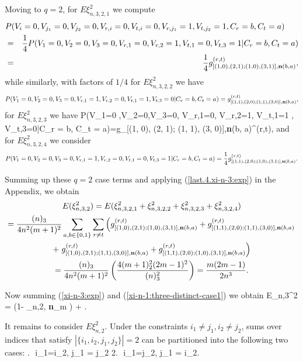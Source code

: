 \documentclass[10pt, amstex]{article}
\begin{document}
Moving to $q=2$, for $E\xi_{n,3,2,1}^2$ we compute
\begin{eqnarray*}
\lefteqn{P(V_i=0 ,V_{j_1}=0,V_{j_2}=0,V_{r,i}=0, V_{t, i} = 0, V_{r,j_1}=1, V_{t,j_2}=1, C_r = b, C_{t} = a)}\\
&=& \frac{1}{4}P(V_1=0 ,V_2=0,V_3=0,V_{r,1}=0, V_{r,2}=1, V_{t,1} = 0, V_{t,3}=1|C_r = b, C_t = a) \\
&=& \frac{1}{4} g_{[(1, 0), (2, 1); (1, 0), (3, 1)], {\bf
n}(b, a)}^{(r,t)},
\end{eqnarray*}
while similarly, with factors of $1/4$ for $E\xi_{n,3,2,2}^2$ we have
\begin{eqnarray*}
P(V_1=0 ,V_2=0,V_3=0,V_{r,1}=1,V_{r,2}=0, V_{t,1}=1, V_{t,3}=0 |C_r = b, C_t = a)
=g_{[(1, 1), (2, 0); (1, 1), (3, 0)],{\bf n}(b, a)}^{(r,t)},
\end{eqnarray*}
for $E\xi_{n,3,2,3}^2$ we have
\beas
P(V_1=0 ,V_2=0,V_3=0, V_{r,1}=0, V_{r,2}=1, V_{t,1}=1 , V_{t,3}=0|C_r = b, C_t = a)=g_{[(1, 0), (2, 1); (1, 1), (3, 0)],{\bf n}(b, a)}^{(r,t)},
\enas
and for $E\xi_{n,3,2,4}^2$ we consider
\begin{eqnarray*}
P(V_1=0 ,V_2=0, V_3=0, V_{r,1}=1, V_{r,2}=0, V_{t,1}=0, V_{t,3}=1|C_r = b, C_t = a)= \frac{1}{4}g_{[(1, 1), (2, 0); (1, 0), (3, 1)], {\bf n}(b, a)}^{(r,t)}.
\end{eqnarray*}


Summing up these $q=2$ case terms and applying (\ref{last.4.xi-n-3:exp}) in the Appendix, we obtain
\begin{multline} \label{xi-n-3:exp}
E(\xi_{n,3,2}^2)=E(\xi_{n,3,2,1}^2+\xi_{n,3,2,2}^2+\xi_{n,3,2,3}^2+\xi_{n,3,2,4}^2) \\
= \frac{(n)_3}{4n^2(m+1)^2}\sum_{a, b \in \{0, 1\}} \sum_{r \ne t} \left(
g_{[(1, 0), (2, 1); (1, 0), (3, 1)], {\bf
n}(b, a)}^{(r,t)} +g_{[(1, 1), (2, 0); (1, 1), (3, 0)], {\bf n}(b, a)}^{(r,t)} \right.  \\
 + \left.  g_{[(1, 0), (2, 1); (1, 1), (3, 0)],{\bf n}(b, a)}^{(r,t)} + g_{[(1, 1), (2, 0); (1, 0), (3, 1)], {\bf n}(b, a)}^{(r,t)} \right)\\
 =\frac{(n)_3}{4n^2(m+1)^2} \left( \frac{4(m+1)_2^2(2m-1)^2}{(n)_3^2} \right) = \frac{m(2m-1)}{2n^3}.
\end{multline}

Now summing (\ref{xi-n-3:exp}) and (\ref{xi-n-1:three-distinct-case1}) we obtain
\bea
E\xi_{n,3}^2  = \left(1- \overline{\lambda}_{n,2,{\bf
n}_m }\right) + . \label{Exin32.sq}
\ena

It remains to consider $E\xi_{n,2}^2$. Under the constraints $i_1 \ne j_1, i_2 \ne j_2$, sums over indices that satisfy $|\{i_1,i_2,j_1,j_2\}|=2$
can be partitioned into the following two cases:
.\,\, i_1=i_2, j_1 = j_2  2.\,\, i_1=j_2, j_1 = i_2.
\enas
\end{document}
